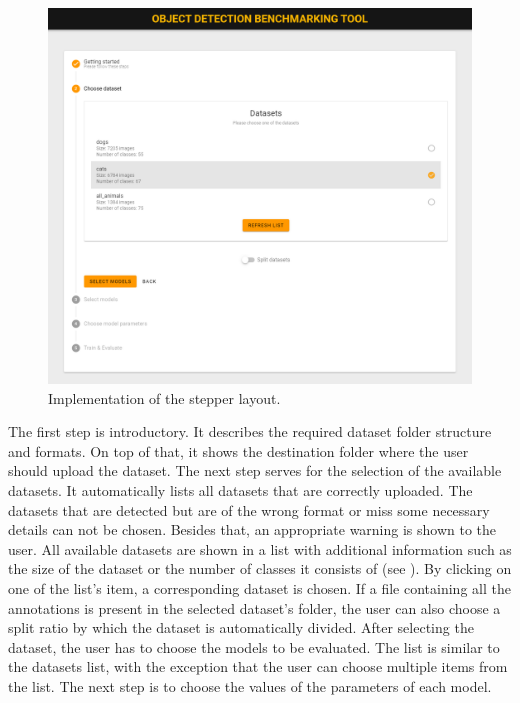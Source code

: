 \begin{figure}[h]
    \centering
    \includegraphics[width=0.85\linewidth]{Sources/Figures/datasets_selection.png}
    \caption{Implementation of the stepper layout.}
    \label{fig:datasets_selection}
\end{figure}

The first step is introductory. It describes the required dataset folder
structure and formats. On top of that, it shows the destination folder where the
user should upload the dataset. The next step serves for the selection of the
available datasets. It automatically lists all datasets that are correctly
uploaded. The datasets that are detected but are of the wrong format or miss
some necessary details can not be chosen. Besides that, an appropriate warning
is shown to the user. All available datasets are shown in a list with additional
information such as the size of the dataset or the number of classes it consists
of (see ). By clicking on one of the list's
item, a corresponding dataset is chosen. If a file containing all the
annotations is present in the selected dataset's folder, the user can also
choose a split ratio by which the dataset is automatically divided. After
selecting the dataset, the user has to choose the models to be evaluated. The
list is similar to the datasets list, with the exception that the user can
choose multiple items from the list. The next step is to choose the values of
the parameters of each model.

